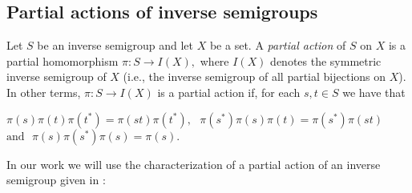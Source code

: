 \documentclass[11pt, a4paper]{amsart}
\theoremstyle{plain}
\newtheorem{definition}[theorem]{Definition}
\begin{document}
\subsection{Partial actions of inverse semigroups}\label{PAISG}

Let $S$ be an inverse semigroup and let $X$ be a set. A \emph{partial action} of $S$ on $X$ is a partial homomorphism  $\pi : S \rightarrow I(X),$ where $I(X)$ denotes the symmetric inverse semigroup of $X$ (i.e., the inverse semigroup of all partial bijections on $X$). In other terms, $\pi : S \rightarrow I(X)$ is a partial action if, for each $s, t \in S$ we have that 
\begin{center}
$ \pi(s)\pi(t)\pi(t^*)  = \pi(st)\pi(t^*), \,\,\,\, \pi(s^*)\pi(s)\pi(t)=\pi(s^*)\pi(st)$
$ \mbox{and}  \,\,\,\, \pi(s)\pi(s^*)\pi(s)=\pi(s). $
\end{center}

In our work we will  use the characterization of a partial action of an inverse semigroup given in \cite[Proposition~3.5]{Buss}: \\



\end{document}
